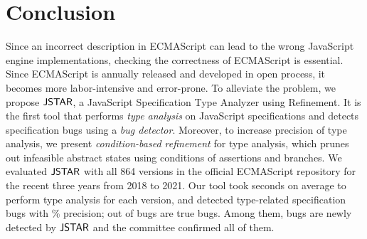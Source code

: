 \section{Conclusion}\label{sec:conclusion}
Since an incorrect description in ECMAScript can lead to the wrong JavaScript
engine implementations, checking the correctness of ECMAScript is essential.
Since ECMAScript is annually released and developed in open process, it becomes
more labor-intensive and error-prone.  To alleviate the problem, we propose
$\tool$, a JavaScript Specification Type Analyzer using Refinement.  It is the
first tool that performs \textit{type analysis} on JavaScript specifications and
detects specification bugs using a \textit{bug detector}.  Moreover, to increase
precision of type analysis, we present \textit{condition-based refinement} for
type analysis, which prunes out infeasible abstract states using conditions of
assertions and branches.  We evaluated $\tool$ with all 864 versions in the
official ECMAScript repository for the recent three years from 2018 to 2021.
Our tool took  seconds on average to perform type analysis for each
version, and detected  type-related specification bugs with
\% precision;  out of  bugs are true bugs.
Among them,  bugs are newly detected by $\tool$ and the committee
confirmed all of them.
